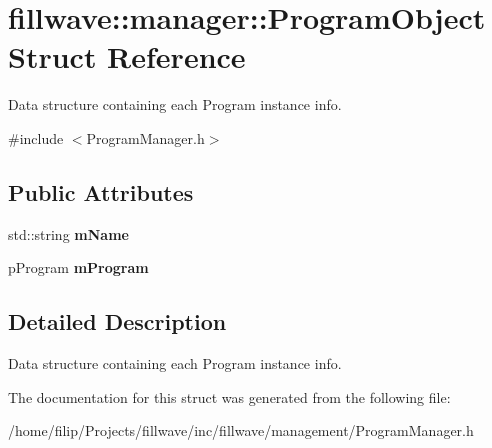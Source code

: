 \hypertarget{structfillwave_1_1manager_1_1ProgramObject}{}\section{fillwave\+:\+:manager\+:\+:Program\+Object Struct Reference}
\label{structfillwave_1_1manager_1_1ProgramObject}


Data structure containing each Program instance info.  




{\ttfamily \#include $<$Program\+Manager.\+h$>$}

\subsection*{Public Attributes}
\begin{DoxyCompactItemize}
\item 
\hypertarget{structfillwave_1_1manager_1_1ProgramObject_a82a419eda128f0e0e99b56f2b887eba9}{}std\+::string {\bfseries m\+Name}\label{structfillwave_1_1manager_1_1ProgramObject_a82a419eda128f0e0e99b56f2b887eba9}

\item 
\hypertarget{structfillwave_1_1manager_1_1ProgramObject_a6ba885b6291833b3b4b6d359d4803fd6}{}p\+Program {\bfseries m\+Program}\label{structfillwave_1_1manager_1_1ProgramObject_a6ba885b6291833b3b4b6d359d4803fd6}

\end{DoxyCompactItemize}


\subsection{Detailed Description}
Data structure containing each Program instance info. 

The documentation for this struct was generated from the following file\+:\begin{DoxyCompactItemize}
\item 
/home/filip/\+Projects/fillwave/inc/fillwave/management/Program\+Manager.\+h\end{DoxyCompactItemize}
